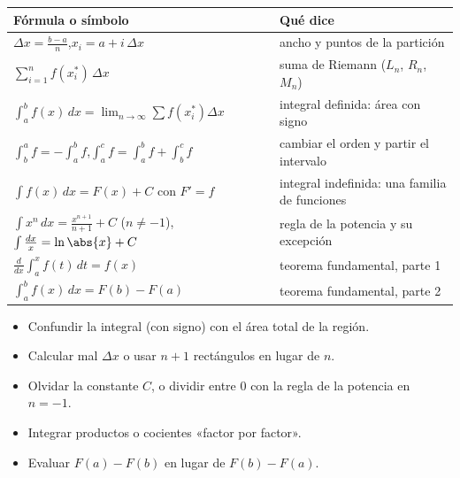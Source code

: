 \documentclass[11pt,a4paper]{article}
\newcommand{\dx}{\,dx}
\begin{document}
\clearpage
\repaso
\begin{center}\renewcommand{\arraystretch}{1.7}
\begin{tabularx}{\linewidth}{@{}>{\raggedright\arraybackslash}p{70mm} L@{}}
\toprule
Fórmula o símbolo & Qué dice\\ \midrule
$\Delta x=\frac{b-a}{n}$,\quad $x_i=a+i\,\Delta x$ & ancho y puntos de la partición\\
$\sum_{i=1}^{n}f(x_i^*)\,\Delta x$ & suma de Riemann ($L_n$, $R_n$, $M_n$)\\
$\int_a^b f(x)\dx=\lim_{n\to\infty}\sum f(x_i^*)\Delta x$ & integral definida: área con signo\\
$\int_b^a f=-\int_a^b f$,\quad $\int_a^c f=\int_a^b f+\int_b^c f$ & cambiar el orden y partir el intervalo\\
$\int f(x)\dx=F(x)+C$ con $F'=f$ & integral indefinida: una familia de funciones\\
$\int x^{n}\dx=\frac{x^{n+1}}{n+1}+C$ ($n\ne-1$),\quad $\int\frac{dx}{x}=\ln\abs{x}+C$ & regla de la potencia y su excepción\\
$\frac{d}{dx}\int_a^x f(t)\,dt=f(x)$ & teorema fundamental, parte 1\\
$\int_a^b f(x)\dx=F(b)-F(a)$ & teorema fundamental, parte 2\\
\bottomrule
\end{tabularx}
\end{center}

\begin{ojo}
\begin{itemize}
\item Confundir la integral (con signo) con el área total de la región.
\item Calcular mal $\Delta x$ o usar $n+1$ rectángulos en lugar de $n$.
\item Olvidar la constante $C$, o dividir entre $0$ con la regla de la potencia en $n=-1$.
\item Integrar productos o cocientes «factor por factor».
\item Evaluar $F(a)-F(b)$ en lugar de $F(b)-F(a)$.
\end{itemize}
\end{ojo}
\end{document}
